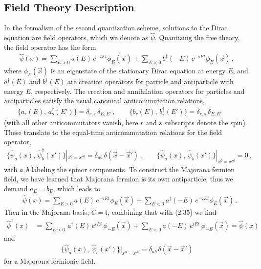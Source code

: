 \documentclass[11pt, oneside]{book}
\theoremstyle{break}
\theoremstyle{break}
\begin{document}
\subsection{Field Theory Description}
In the formalism of the second quantization scheme, solutions to the Dirac equation are field operators, which we denote as $\hat{\psi}$. Quantizing the free theory, the field operator has the form
\begin{align}
\hat{\psi}(x) = \sum_{E>0}a(E)\,e^{-iEt}\phi_E(\vec{x}) + \sum_{E<0}b^\dagger(-E)\,e^{-iEt}\phi_E(\vec{x})\,,
\end{align}
where $\phi_E(\vec{x})$ is an eigenstate of the stationary Dirac equation at energy $E$, and $a^\dagger(E)$ and $b^\dagger(E)$ are creation operators for particle and antiparticle with energy $E$, respectively. The creation and annihilation operators for particles and antiparticles satisfy the usual canonical anticommutation relations,
\begin{align}
\{a_r(E),\, a_s^\dagger(E')\} = \delta_{r,s}\, \delta_{E,E'}\,,\qquad
\{b_r(E),\, b_s^\dagger(E')\} = \delta_{r,s}\, \delta_{E,E'}\,\qquad
\end{align}
(with all other anticommutators vanish, here $r$ and $s$ subscripts denote the spin). These translate to the equal-time anticommutation relations for the field operator, 
\begin{align}
\{\hat{\psi}_a(x),\, \hat{\psi}_b^\dagger(x')\}|_{x^0=x'{}^0} = \delta_{ab}\, \delta(\vec{x}-\vec{x}')\,,\qquad
\{\hat{\psi}_a(x),\, \hat{\psi}_b(x')\}|_{x^0=x'{}^0} = 0\,,
\end{align}
with $a,b$ labeling the spinor components. To construct the Majorana fermion field, we have learned that Majorana fermion is its own antiparticle, thus we demand $a_E = b_E$, which leads to 
\begin{align}
&\hat{\psi}(x) = \sum_{E>0}a(E)\,e^{-iEt}\phi_E(\vec{x}) + \sum_{E<0}a^\dagger(-E)\,e^{-iEt}\phi_E(\vec{x})\,.                                                                                                                                                                                                                                                                                                                                                                                                                                                                                                                                                                                                                                                                                                                                                      
\end{align}
Then in the Majorana basis, $C = \mathbb{I}$, combining that with (2.35) we find 
\begin{align}
\hat{\psi}^\dagger(x) 
&= \sum_{E>0}\, a^\dagger(E)\, e^{iEt}\, \phi_{-E}(\vec{x}) +\sum_{E<0}a(-E)\, e^{iEt}\, \phi_{-E}(\vec{x}) = \hat{\psi}(x)
\end{align}
and 
\begin{align}
\{\hat{\psi}_a(x),\, \hat{\psi}_b(x')\}|_{x^0=x'{}^0} = \delta_{ab}\, \delta(\vec{x}-\vec{x}')
\end{align}
for a Majorana fermionic field.
\end{document}
